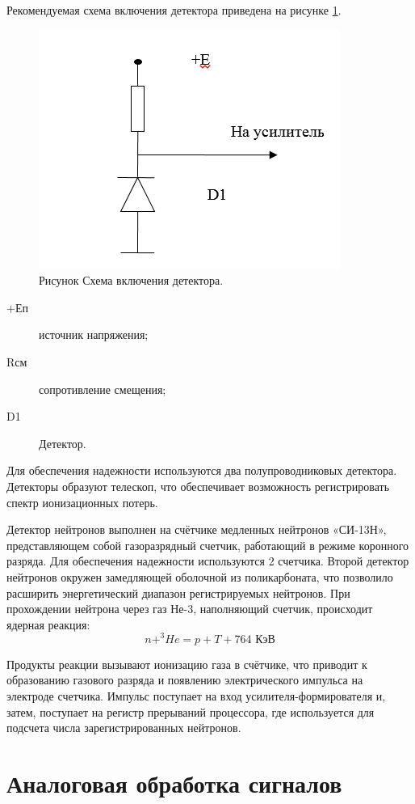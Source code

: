 Рекомендуемая схема включения детектора приведена на рисунке \ref{fig:detector_sch}. 

\begin{figure}[h]
\centering
\includegraphics[width=0.5\linewidth]{images/detector_sch}
\caption{Рисунок Схема включения детектора.}
\label{fig:detector_sch}
\end{figure}
\begin{description}
	\item[+Еп] источник напряжения;
	\item[Rсм] сопротивление смещения;
	\item[D1] Детектор.
\end{description}


Для обеспечения надежности используются два полупроводниковых детектора. Детекторы образуют телескоп, что обеспечивает возможность регистрировать спектр ионизационных потерь.

Детектор нейтронов выполнен на счётчике медленных нейтронов «СИ-13Н», представляющем собой газоразрядный  счетчик, работающий в режиме коронного разряда. Для обеспечения надежности используются 2 счетчика. Второй детектор нейтронов окружен замедляющей оболочной из поликарбоната, что позволило расширить энергетический диапазон регистрируемых нейтронов. При прохождении нейтрона через газ Не-3, наполняющий счетчик, происходит ядерная реакция:
\[ n+^3\!He = p+T+764 \textrm{ КэВ}\]

Продукты реакции вызывают ионизацию газа в счётчике, что приводит к образованию газового разряда и появлению электрического импульса на электроде счетчика. Импульс поступает на вход усилителя-формирователя и, затем, поступает на регистр прерываний процессора, где используется для подсчета числа зарегистрированных нейтронов.

\section{Аналоговая обработка сигналов}


